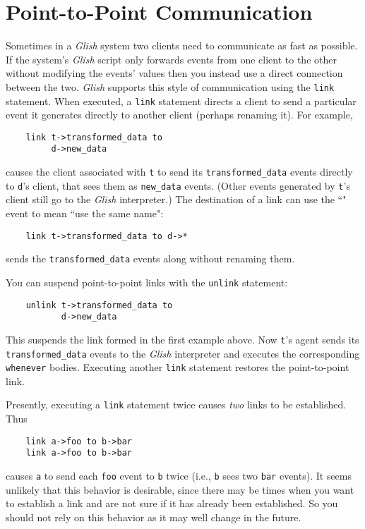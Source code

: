 \section{Point-to-Point Communication}
\label{point-to-point}

Sometimes in a {\em Glish} system two clients need to communicate as fast as
possible.  If the system's {\em Glish} script only forwards events from
one client to the other without modifying the events' values
then you  instead use a
direct connection between the two.  {\em Glish} supports this style of
communication using the {\tt link} statement.  When executed, a {\tt link}
statement directs a client to send a particular event it generates
directly to another client (perhaps renaming it).  For example,
\begin{verbatim}
    link t->transformed_data to
         d->new_data
\end{verbatim}
causes the client associated with {\tt t} to send its
{\tt transformed\_data} events directly to {\tt d}'s client, that
sees them as {\tt new\_data} events.  (Other events generated by {\tt t}'s
client still go to the {\em Glish} interpreter.)  The destination of
a link can use the ``{\tt *}" event to mean ``use the same name":
\begin{verbatim}
    link t->transformed_data to d->*
\end{verbatim}
sends the {\tt transformed\_data} events along without renaming them.

You can suspend point-to-point links with the {\tt unlink} statement:
\begin{verbatim}
    unlink t->transformed_data to
           d->new_data
\end{verbatim}
This suspends the link formed in the first example above. Now
{\tt t}'s agent sends its {\tt transformed\_data} events 
to the {\em Glish}
interpreter and executes the corresponding {\tt whenever} bodies.
Executing another {\tt link} statement restores the point-to-point
link.

Presently, executing a {\tt link} statement twice causes {\em two} links
to be established.  Thus
\begin{verbatim}
    link a->foo to b->bar
    link a->foo to b->bar
\end{verbatim}
causes {\tt a} to send each {\tt foo} event to {\tt b} twice (i.e., {\tt b}
sees two {\tt bar} events).  It seems unlikely that this behavior is
desirable, since there may be times when you want to establish a link and
are not sure if it has already been established.  So you should not rely
on this behavior as it may well change in the future.

